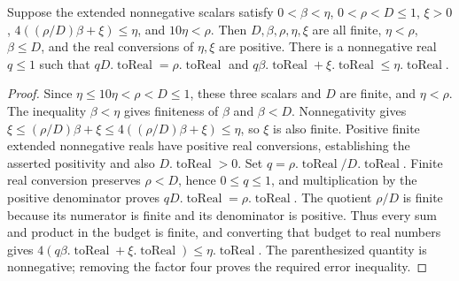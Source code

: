 \begin{lemma}
Suppose the extended nonnegative scalars satisfy
$0<\beta<\eta$, $0<\rho<D\leq1$, $\xi>0$,
$4((\rho/D)\beta+\xi)\leq\eta$, and $10\eta<\rho$.
Then $D,\beta,\rho,\eta,\xi$ are all finite, $\eta<\rho$, $\beta\leq D$,
and the real conversions of $\eta,\xi$ are positive. There is a
nonnegative real $q\leq1$ such that
$qD.\operatorname{toReal}=\rho.\operatorname{toReal}$ and
$q\beta.\operatorname{toReal}+\xi.\operatorname{toReal}
\leq\eta.\operatorname{toReal}$.
\end{lemma}
\begin{proof}
Since $\eta\leq10\eta<\rho<D\leq1$, these three scalars and $D$ are
finite, and $\eta<\rho$. The inequality $\beta<\eta$ gives finiteness
of $\beta$ and $\beta<D$. Nonnegativity gives
$\xi\leq(\rho/D)\beta+\xi\leq4((\rho/D)\beta+\xi)\leq\eta$, so $\xi$
is also finite. Positive finite extended nonnegative reals have positive
real conversions, establishing the asserted positivity and also
$D.\operatorname{toReal}>0$.
Set $q=\rho.\operatorname{toReal}/D.\operatorname{toReal}$. Finite real
conversion preserves $\rho<D$, hence $0\leq q\leq1$, and multiplication
by the positive denominator proves $qD.\operatorname{toReal}
=\rho.\operatorname{toReal}$. The quotient $\rho/D$ is finite because
its numerator is finite and its denominator is positive. Thus every
sum and product in the budget is finite, and converting that budget
to real numbers gives $4(q\beta.\operatorname{toReal}
+\xi.\operatorname{toReal})\leq\eta.\operatorname{toReal}$.
The parenthesized quantity is nonnegative; removing the factor four
proves the required error inequality.
\end{proof}
